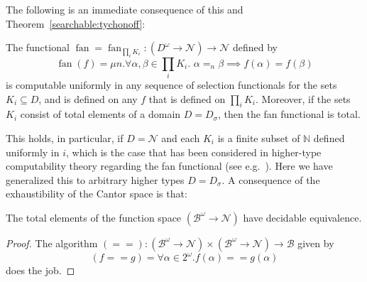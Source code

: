 \documentclass{LMCS}
\newcommand{\myomega}{\omega}
\newcommand{\N}{\mathbb{N}}
\newcommand{\Bool}{2}\newcommand{\Sierp}{\mathcal{S}}
\newcommand{\pN}{\mathcal{N}}
\newcommand{\pBool}{\mathcal{B}}
\newcommand{\D}{D}
\begin{document}
\medskip
The following is an immediate consequence of this and
Theorem~\ref{searchable:tychonoff}:
\begin{cor} \label{fan}
  The functional $\operatorname{fan}=\operatorname{fan}_{\prod_i K_i}
  \colon (\D^\myomega \to \pN) \to \pN$ defined by
\[
  \operatorname{fan}(f) = \mu n.\forall \alpha,\beta \in \prod_i K_i.\,\, \alpha =_n \beta \implies f(\alpha)=f(\beta)
\]
is computable uniformly in any sequence of selection functionals for
the sets~$K_i \subseteq D$, and is defined on any $f$ that is defined
on $\prod_ i {K_i}$. Moreover, if the sets $K_i$ consist of total
elements of a domain $D=D_\sigma$, then the fan functional is total.
\end{cor}
This holds, in particular, if $\D=\pN$ and each $K_i$ is a finite
subset of $\N$ defined uniformly in $i$, which is the case that has
been considered in higher-type computability theory regarding the fan
functional (see e.g.~\cite{gandy77}).
Here we have generalized this to
arbitrary higher types $\D=\D_{\sigma}$.
A consequence of the exhaustibility of the Cantor space is that:
\begin{cor}\label{decidable:equivalence}
  The total elements of the function space $(\pBool^\omega \to \pN)$
  have decidable equivalence.
\end{cor}
\begin{proof}
  The algorithm $(==) \colon (\pBool^\omega \to \pN) \times (\pBool^\omega
  \to \pN) \to \pBool$ given by  \[(f == g) = \forall \alpha \in
  \Bool^\omega. f(\alpha) == g(\alpha)\]
  does the job.
\end{proof}
\end{document}
